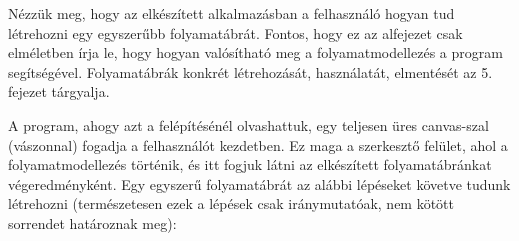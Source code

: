 
Nézzük meg, hogy az elkészített alkalmazásban a felhasználó hogyan tud létrehozni egy egyszerűbb folyamatábrát. Fontos, hogy ez az alfejezet csak elméletben írja le, hogy hogyan valósítható meg a folyamatmodellezés a program segítségével. Folyamatábrák konkrét létrehozását, használatát, elmentését az 5. fejezet tárgyalja.

A program, ahogy azt a felépítésénél olvashattuk, egy teljesen üres canvas-szal (vászonnal) fogadja a felhasználót kezdetben. Ez maga a szerkesztő felület, ahol a folyamatmodellezés történik, és itt fogjuk látni az elkészített folyamatábránkat végeredményként. Egy egyszerű folyamatábrát az alábbi lépéseket követve tudunk létrehozni (természetesen ezek a lépések csak iránymutatóak, nem kötött sorrendet határoznak meg):

